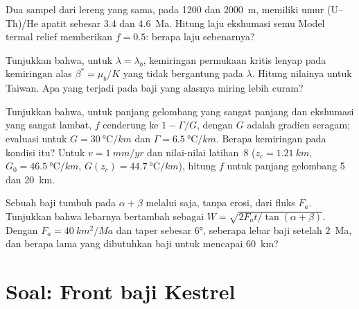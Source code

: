\begin{exercise}[$\star\star$]\label{exo:b3:orogenic-wedges:9}
Dua sampel dari lereng yang sama, pada 1200 dan \qty{2000}{m}, memiliki umur
(U--Th)/He apatit sebesar 3.4 dan \qty{4.6}{Ma}. Hitung laju ekshumasi semu
Model termal relief memberikan $f = 0.5$: berapa laju sebenarnya?
\end{exercise}

\begin{exercise}[$\star\star\star$]\label{exo:b3:orogenic-wedges:10}
Tunjukkan bahwa, untuk $\lambda = \lambda_b$, kemiringan permukaan kritis lenyap pada
kemiringan alas $\beta^* = \mu_b/K$ yang tidak bergantung pada $\lambda$. Hitung nilainya untuk
Taiwan. Apa yang terjadi pada baji yang alasnya miring lebih curam?
\end{exercise}

\begin{exercise}[$\star\star\star$]\label{exo:b3:orogenic-wedges:11}
Tunjukkan bahwa, untuk panjang gelombang yang sangat panjang dan ekshumasi yang sangat lambat, $f$ cenderung ke
$1 - \Gamma/G$, dengan $G$ adalah gradien seragam; evaluasi untuk $G =
\qty{30}{\celsius/km}$ dan $\Gamma = \qty{6.5}{\celsius/km}$. Berapa kemiringan
 pada kondisi itu? Untuk $v = \qty{1}{mm/yr}$ dan nilai-nilai
latihan~8 ($z_c = \qty{1.21}{km}$, $G_0 = \qty{46.5}{\celsius/km}$,
$G(z_c) = \qty{44.7}{\celsius/km}$), hitung $f$ untuk panjang gelombang 5 dan
\qty{20}{km}.
\end{exercise}

\begin{exercise}[$\star\star\star$]\label{exo:b3:orogenic-wedges:12}
Sebuah baji tumbuh pada  $\alpha + \beta$ melalui 
saja, tanpa erosi, dari fluks $F_a$. Tunjukkan bahwa lebarnya bertambah sebagai
$W = \sqrt{2F_at/\tan(\alpha + \beta)}$. Dengan $F_a = \qty{40}{km^2/Ma}$ dan
taper sebesar \ang{6}, seberapa lebar baji setelah \qty{2}{Ma}, dan berapa lama
yang dibutuhkan baji untuk mencapai \qty{60}{km}?
\end{exercise}

\section{Soal: Front baji Kestrel}

